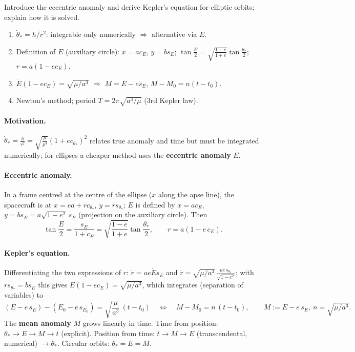 \begin{qbox}
Introduce the eccentric anomaly and derive Kepler's equation for elliptic orbits; explain how it is solved.
\end{qbox}
\begin{outline}
\begin{enumerate}
\item $\dot\theta_*=h/r^2$: integrable only numerically $\Rightarrow$ alternative via $E$.
\item Definition of $E$ (auxiliary circle): $x=ac_E$, $y=bs_E$; $\tan\frac E2=\sqrt{\frac{1-e}{1+e}}\tan\frac{\theta_*}{2}$; $r=a(1-ec_E)$.
\item $\dot E(1-ec_E)=\sqrt{\mu/a^3}$ $\Rightarrow$ $M=E-es_E$, $M-M_0=n(t-t_0)$.
\item Newton's method; period $T=2\pi\sqrt{a^3/\mu}$ (3rd Kepler law).
\end{enumerate}
\end{outline}
\answer
\paragraph{Motivation.} $\dot\theta_*=\frac{h}{r^2}=\sqrt{\frac{\mu}{p^3}}(1+ec_{\theta_*})^2$ relates true anomaly and time but must be integrated
numerically; for ellipses a cheaper method uses the \textbf{eccentric anomaly} $E$.

\paragraph{Eccentric anomaly.} In a frame centred at the centre of the ellipse ($x$ along the apse line), the spacecraft is at
$x=ea+rc_{\theta_*}$, $y=rs_{\theta_*}$; $E$ is defined by $x=ac_E$, $y=bs_E=a\sqrt{1-e^2}\,s_E$ (projection on the auxiliary circle). Then
\begin{equation}
\tan\frac E2=\frac{s_E}{1+c_E}=\sqrt{\frac{1-e}{1+e}}\tan\frac{\theta_*}{2},\qquad r=a\left(1-e\,c_E\right).
\end{equation}

\paragraph{Kepler's equation.} Differentiating the two expressions of $r$: $\dot r=ae\dot Es_E$ and $\dot r=\sqrt{\mu/a^3}\,\frac{ae\,s_{\theta_*}}{\sqrt{1-e^2}}$;
with $rs_{\theta_*}=bs_E$ this gives $\dot E(1-ec_E)=\sqrt{\mu/a^3}$, which integrates (separation of variables) to
\begin{equation}
\left(E-e\,s_{E}\right)-\left(E_{0}-e\,s_{E_{0}}\right)=\sqrt{\frac{\mu}{a^{3}}}\,(t-t_{0})
\quad\Longleftrightarrow\quad M-M_0=n\,(t-t_0),\qquad M:=E-e\,s_E,\ n=\sqrt{\mu/a^3}.
\end{equation}
The \textbf{mean anomaly} $M$ grows linearly in time. Time from position: $\theta_*\to E\to M\to t$ (explicit). Position from time:
$t\to M\to E$ (transcendental, numerical) $\to\theta_*$. Circular orbits: $\theta_*=E=M$.

